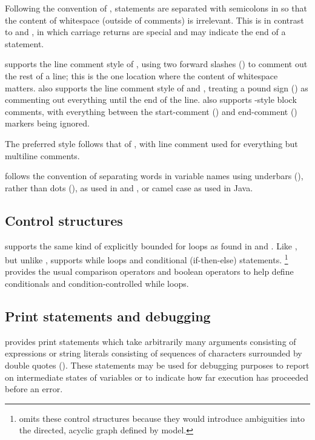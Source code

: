 \documentclass[article]{jss}
\begin{document}
Following the convention of , statements are separated
with semicolons in  so that the content of whitespace
(outside of comments) is irrelevant.  This is in contrast to
 and , in which carriage returns are
special and may indicate the end of a statement.

 supports the line comment style of ,
using two forward slashes (\code{//}) to comment out the rest of a
line; this is the one location where the content of whitespace
matters.   also supports the line comment style of  and
, treating a pound sign (\code{\#}) as commenting out
everything until the end of the line.   also supports
-style block comments, with everything between the
start-comment (\code{/*}) and end-comment (\code{*/}) markers being
ignored. 

The preferred style follows that of , with line comment
used for everything but multiline comments.  

 follows the  convention of separating words in
variable names using underbars (\code{\_}), rather than dots
(), as used in  and , or camel case
as used in Java.

\subsection{Control structures}

 supports the same kind of explicitly bounded for loops
as found in  and .  Like , but unlike
,  supports while loops and conditional
(if-then-else) statements.%
%
\footnote{ omits these control structures because they
  would introduce ambiguities into the directed, acyclic graph defined
  by model.}
%
 provides the usual comparison operators and boolean
operators to help define conditionals and condition-controlled while
loops.  

\subsection{Print statements and debugging}

 provides print statements which take arbitrarily many
arguments consisting of expressions or string literals consisting of
sequences of characters surrounded by double quotes ().
These statements may be used for debugging purposes to report on
intermediate states of variables or to indicate how far execution has
proceeded before an error.
\end{document}
